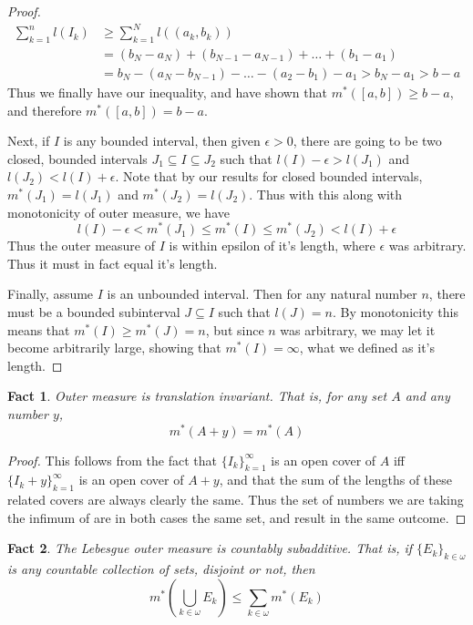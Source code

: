 \documentclass{article}
\theoremstyle{definition}
\theoremstyle{plain}
\theoremstyle{theorem}
\newtheorem{fact}{Fact}[section]
\begin{document}
\begin{proof}
\begin{align*}
	\sum_{k=1}^n l(I_k) &\geq \sum_{k=1}^N l((a_k,b_k)) \\
		&= (b_N-a_N)+(b_{N-1} - a_{N-1}) + \ldots + (b_1-a_1) \\
		&= b_N-(a_N-b_{N-1}) - \ldots - (a_2-b_1) - a_1 > b_N-a_1 > b-a
\end{align*}
Thus we finally have our inequality, and have shown that $m^*([a,b]) \geq b-a$, and therefore $m^*([a,b]) = b-a$. \par
Next, if $I$ is any bounded interval, then given $\epsilon > 0$, there are going to be two closed, bounded intervals $J_1 \subseteq I \subseteq J_2$ such that $l(I)-\epsilon > l(J_1)$ and $l(J_2) < l(I)+\epsilon$. Note that by our results for closed bounded intervals, $m^*(J_1) = l(J_1)$ and $m^*(J_2) = l(J_2)$. Thus with this along with monotonicity of outer measure, we have
\[ l(I)-\epsilon < m^*(J_1) \leq m^*(I) \leq m^*(J_2) < l(I)+\epsilon \]
Thus the outer measure of $I$ is within epsilon of it's length, where $\epsilon$ was arbitrary. Thus it must in fact equal it's length. \par 
Finally, assume $I$ is an unbounded interval. Then for any natural number $n$, there must be a bounded subinterval $J \subseteq I$ such that $l(J) = n$. By monotonicity this means that $m^*(I) \geq m^*(J) = n$, but since $n$ was arbitrary, we may let it become arbitrarily large, showing that $m^*(I) = \infty$, what we defined as it's length. 
\end{proof}
\begin{fact}
	Outer measure is translation invariant. That is, for any set $A$ and any number $y$,
	\[ m^*(A+y) = m^*(A) \]
\end{fact}
\begin{proof}
	This follows from the fact that $\{I_k\}_{k=1}^{\infty}$ is an open cover of $A$ iff $\{I_k+y\}_{k=1}^{\infty}$ is an open cover of $A+y$, and that the sum of the lengths of these related covers are always clearly the same. Thus the set of numbers we are taking the infimum of are in both cases the same set, and result in the same outcome.
\end{proof}
\begin{fact}
	The Lebesgue outer measure is countably subadditive. That is, if $\{E_k\}_{k \in \omega}$ is any countable collection of sets, disjoint or not, then 
	\[ m^*\left( \bigcup_{k \in \omega}E_k \right) \leq \sum_{k \in \omega} m^*(E_k) \]
\end{fact}
\end{document}
